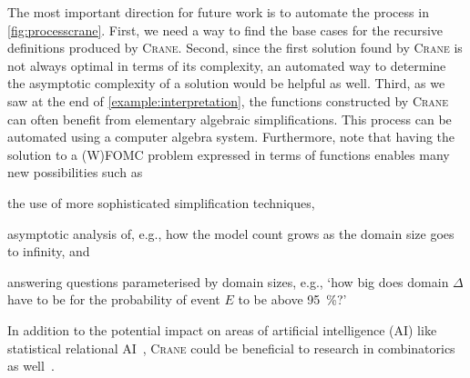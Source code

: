 \documentclass{article}
\begin{document}
The most important direction for future work is to automate the process in
\cref{fig:processcrane}. First, we need a way to find the base cases for the
recursive definitions produced by \textsc{Crane}. Second, since the first
solution found by \textsc{Crane} is not always optimal in terms of its
complexity, an automated way to determine the asymptotic complexity of a
solution would be helpful as well. Third, as we saw at the end of
\cref{example:interpretation}, the functions constructed by \textsc{Crane} can
often benefit from elementary algebraic simplifications. This process can be
automated using a computer algebra system. Furthermore, note that having the
solution to a (W)FOMC problem expressed in terms of functions enables many new
possibilities such as
\begin{enumerate*}[label=(\roman*)]
  \item the use of more sophisticated simplification techniques,
  \item asymptotic analysis of, e.g., how the model count grows as the domain
  size goes to infinity, and
  \item answering questions parameterised by domain sizes, e.g., `how big does
  domain $\Delta$ have to be for the probability of event $E$ to be above
  \SI{95}{\percent}?'
\end{enumerate*}
In addition to the potential impact on areas of artificial intelligence (AI)
like statistical relational AI~\cite{DBLP:series/synthesis/2016Raedt},
\textsc{Crane} could be beneficial to research in combinatorics as
well~\cite{DBLP:conf/ilp/BarvinekB0ZK21}.



\end{document}

